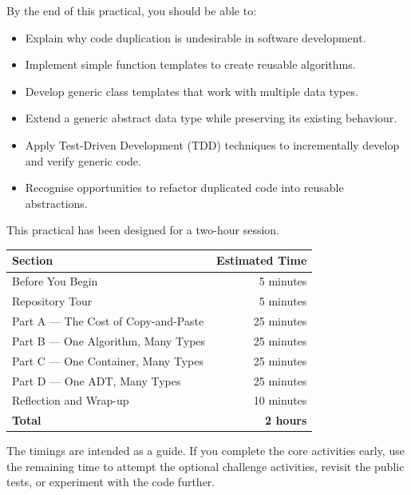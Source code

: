\documentclass{csc2059practical}
\begin{document}
\begin{learningoutcomes}

By the end of this practical, you should be able to:

\begin{itemize}

\item Explain why code duplication is undesirable in software development.

\item Implement simple function templates to create reusable algorithms.

\item Develop generic class templates that work with multiple data types.

\item Extend a generic abstract data type while preserving its existing
behaviour.

\item Apply Test-Driven Development (TDD) techniques to incrementally develop
and verify generic code.

\item Recognise opportunities to refactor duplicated code into reusable
abstractions.

\end{itemize}

\end{learningoutcomes}


\begin{infobox}

This practical has been designed for a two-hour session.

\begin{center}
\begin{tabular}{lr}
\textbf{Section} & \textbf{Estimated Time}\\
\hline
Before You Begin & 5 minutes\\
Repository Tour & 5 minutes\\
Part A --- The Cost of Copy-and-Paste & 25 minutes\\
Part B --- One Algorithm, Many Types & 25 minutes\\
Part C --- One Container, Many Types & 25 minutes\\
Part D --- One ADT, Many Types & 25 minutes\\
Reflection and Wrap-up & 10 minutes\\
\hline
\textbf{Total} & \textbf{2 hours}\\
\end{tabular}
\end{center}

The timings are intended as a guide. If you complete the core activities early,
use the remaining time to attempt the optional challenge activities, revisit the
public tests, or experiment with the code further.

\end{infobox}
\end{document}
